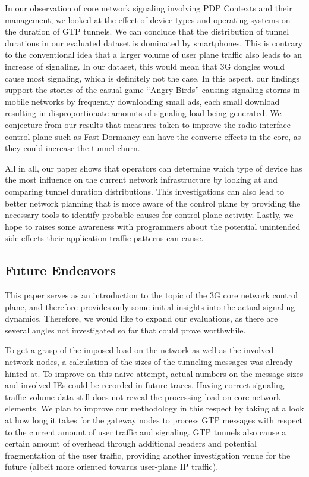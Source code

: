In our observation of core network signaling involving PDP Contexts and their management, we looked at the effect of device types and operating systems on the duration of GTP tunnels. We can conclude that the distribution of tunnel durations in our evaluated dataset is dominated by smartphones. This is contrary to the conventional idea that a larger volume of user plane traffic also leads to an increase of signaling. In our dataset, this would mean that 3G dongles would cause most signaling, which is definitely not the case. In this aspect, our findings support the stories of the casual game ``Angry Birds'' causing signaling storms in mobile networks by frequently downloading small ads, each small download resulting in disproportionate amounts of signaling load being generated. We conjecture from our results that measures taken to improve the radio interface control plane such as Fast Dormancy can have the converse effects in the core, as they could increase the tunnel churn.

All in all, our paper shows that operators can determine which type of device has the most influence on the current network infrastructure by looking at and comparing tunnel duration distributions. %
This investigations can also lead to better network planning that is more aware of the control plane by providing the necessary tools to identify probable causes for control plane activity. Lastly, we hope to raises some awareness with programmers about the potential unintended side effects their application traffic patterns can cause.

\subsection{Future Endeavors}

This paper serves as an introduction to the topic of the 3G core network control plane, and therefore provides only some initial insights into the actual signaling dynamics. Therefore, we would like to expand our evaluations, as there are several  angles not investigated so far that could prove worthwhile.

To get a grasp of the imposed load on the network as well as the involved network nodes, a calculation of the sizes of the tunneling messages was already hinted at. To improve on this naive attempt, actual numbers on the message sizes and involved \glspl{IE} could be recorded in future traces. Having correct signaling traffic volume data still does not reveal the processing load on core network elements. We plan to improve our methodology in this respect by taking at a look at how long it takes for the gateway nodes to process \gls{GTP} messages with respect to the current amount of user traffic and signaling. \gls{GTP} tunnels also cause a certain amount of overhead through additional headers and potential fragmentation of the user traffic, providing another investigation venue for the future (albeit more oriented towards user-plane IP traffic). 

